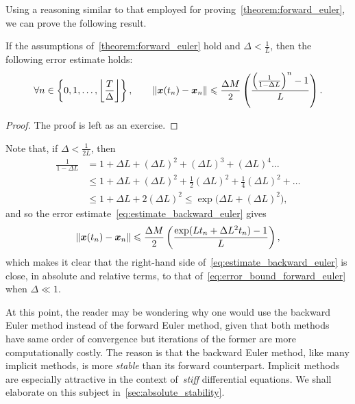 Using a reasoning similar to that employed for proving~\cref{theorem:forward_euler},
we can prove the following result.
\begin{theorem}
    If the assumptions of~\cref{theorem:forward_euler} hold and $\Delta < \frac{1}{L}$,
    then the following error estimate holds:
    \begin{equation}
        \label{eq:estimate_backward_euler}
        \forall n \in \left\{0, 1, \dotsc, \floor*{\frac{T}{\Delta}} \right\},
        \qquad
        \vecnorm{\vect x(t_n) - \vect x_n}
        \leq
        \frac{\Delta M}{2} \left( \frac{\left( \frac{1}{1 - \Delta L} \right)^n - 1}{L} \right).
    \end{equation}
\end{theorem}
\begin{proof}
    The proof is left as an exercise.
\end{proof}
\begin{remark}
    Note that, if $\Delta < \frac{1}{2L}$,
    then
    \begin{align*}
         \frac{1}{1 - \Delta L}
         &= 1 + \Delta L + (\Delta L)^2 + (\Delta L)^3 + (\Delta L)^4 \dotsc \\
         &\leq 1 + \Delta L + (\Delta L)^2 + \frac{1}{2} (\Delta L)^2 + \frac{1}{4} (\Delta L)^2 + \dotsc \\
         &\leq 1 + \Delta L + 2 (\Delta L)^2 \leq \exp\bigl(\Delta L + (\Delta L)^2\bigr),
     \end{align*}
     and so the error estimate~\eqref{eq:estimate_backward_euler} gives
     \[
        \lVert\mathbf{\boldsymbol{x}}(t_n) - \mathbf{\boldsymbol{x}}_n\rVert
        \leqslant
        \frac{\Delta M}{2} \left( \frac{\exp(L t_n + \Delta L^2 t_n) - 1}{L} \right),
     \]
     which makes it clear that the right-hand side of~\eqref{eq:estimate_backward_euler} is close,
     in absolute and relative terms, to that of~\eqref{eq:error_bound_forward_euler} when $\Delta \ll 1$.
\end{remark}
At this point, the reader may be wondering why one would use the backward Euler method instead of the forward Euler method,
given that both methods have same order of convergence but iterations of the former are more computationally costly.
The reason is that the backward Euler method,
like many implicit methods,
is more \emph{stable} than its forward counterpart.
Implicit methods are especially attractive in the context of~\emph{stiff} differential equations.
We shall elaborate on this subject in~\cref{sec:absolute_stability}.

